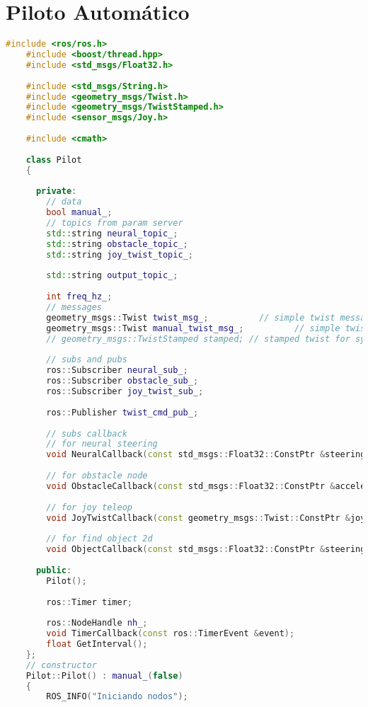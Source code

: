 \section{Piloto Automático}

\begin{lstlisting}[title={pilot\_node.cpp},language=c++]
    #include <ros/ros.h>
    #include <boost/thread.hpp>
    #include <std_msgs/Float32.h>
    
    #include <std_msgs/String.h>
    #include <geometry_msgs/Twist.h>
    #include <geometry_msgs/TwistStamped.h>
    #include <sensor_msgs/Joy.h>
    
    #include <cmath>
    
    class Pilot
    {
    
      private:
        // data
        bool manual_;
        // topics from param server
        std::string neural_topic_;
        std::string obstacle_topic_;
        std::string joy_twist_topic_;
    
        std::string output_topic_;
    
        int freq_hz_;
        // messages
        geometry_msgs::Twist twist_msg_;          // simple twist message from joystick
        geometry_msgs::Twist manual_twist_msg_;          // simple twist message from joystick
        // geometry_msgs::TwistStamped stamped; // stamped twist for sync
    
        // subs and pubs
        ros::Subscriber neural_sub_;
        ros::Subscriber obstacle_sub_;
        ros::Subscriber joy_twist_sub_;
    
        ros::Publisher twist_cmd_pub_;
    
        // subs callback
        // for neural steering
        void NeuralCallback(const std_msgs::Float32::ConstPtr &steering);
    
        // for obstacle node
        void ObstacleCallback(const std_msgs::Float32::ConstPtr &acceleration);
    
        // for joy teleop
        void JoyTwistCallback(const geometry_msgs::Twist::ConstPtr &joy_twist);
    
        // for find object 2d
        void ObjectCallback(const std_msgs::Float32::ConstPtr &steering);
    
      public:
        Pilot();
    
        ros::Timer timer;
    
        ros::NodeHandle nh_;
        void TimerCallback(const ros::TimerEvent &event);
        float GetInterval();
    };
    // constructor
    Pilot::Pilot() : manual_(false)
    {
        ROS_INFO("Iniciando nodos");
    

\end{lstlisting}
